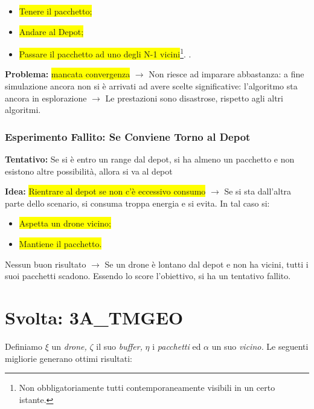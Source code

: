 \documentclass[12pt]{article}
\begin{document}
\begin{itemize}

    \item \colorbox{yellow}{Tenere il pacchetto;}
    
    \item \colorbox{yellow}{Andare al Depot;}
    \item \colorbox{yellow}{Passare il pacchetto ad uno degli N-1 vicini}\footnote{Non obbligatoriamente tutti contemporaneamente visibili in un certo istante.}.
    .
\end{itemize}

\textbf{Problema:} \colorbox{yellow}{mancata convergenza} $\rightarrow$ Non riesce ad imparare abbastanza: a fine simulazione ancora non si è arrivati ad avere scelte significative: l'algoritmo sta ancora in esplorazione $\rightarrow$ Le prestazioni sono disastrose, rispetto agli altri algoritmi.

\subsubsection{Esperimento \textbf{Fallito:} Se Conviene Torno al Depot}

\textbf{Tentativo:} Se si è entro un range dal depot, si ha almeno un pacchetto e non esistono altre possibilità, allora si va al depot 

\textbf{Idea:} \colorbox{yellow}{Rientrare al depot se non c'è eccessivo consumo} $\rightarrow$ Se si sta dall'altra parte dello scenario, si consuma troppa energia e si evita. In tal caso si:

\begin{itemize}

    \item \colorbox{yellow}{Aspetta un drone vicino;}
    
    \item \colorbox{yellow}{Mantiene il pacchetto.}
    
\end{itemize}

Nessun buon risultato $\rightarrow$ Se un drone è lontano dal depot e non ha vicini, tutti i suoi pacchetti scadono. Essendo lo score l'obiettivo, si ha un tentativo fallito.

\section{Svolta: 3A\_TMGEO}

Definiamo $\xi$ un \textit{drone,} $\zeta$ il suo \textit{buffer,} $\eta$ i \textit{pacchetti} ed $\alpha$ un suo \textit{vicino.} Le seguenti migliorie generano ottimi risultati:
\end{document}
